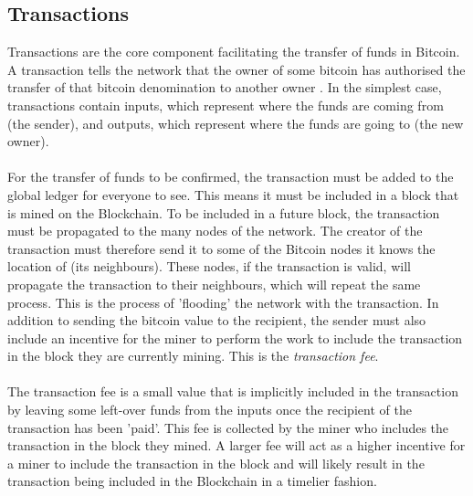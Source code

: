 \subsection{Transactions}\label{background-transactions}
Transactions are the core component facilitating the transfer of funds in Bitcoin. A transaction tells the network that the owner of some bitcoin has authorised the transfer of that bitcoin denomination to another owner \cite{RefWorks:doc:5c39e80ae4b0854ae611b047}. In the simplest case, transactions contain inputs, which represent where the funds are coming from (the sender), and outputs, which represent where the funds are going to (the new owner). 
\\\\
For the transfer of funds to be confirmed, the transaction must be added to the global ledger for everyone to see. This means it must be included in a block that is mined on the Blockchain. To be included in a future block, the transaction must be propagated to the many nodes of the network. The creator of the transaction must therefore send it to some of the Bitcoin nodes it knows the location of (its neighbours). These nodes, if the transaction is valid, will propagate the transaction to their neighbours, which will repeat the same process. This is the process of 'flooding' the network with the transaction. In addition to sending the bitcoin value to the recipient, the sender must also include an incentive for the miner to perform the work to include the transaction in the block they are currently mining. This is the \textit{transaction fee}.
\\\\
The transaction fee is a small value that is implicitly included in the transaction by leaving some left-over funds from the inputs once the recipient of the transaction has been 'paid'. This fee is collected by the miner who includes the transaction in the block they mined. A larger fee will act as a higher incentive for a miner to include the transaction in the block and will likely result in the transaction being included in the Blockchain in a timelier fashion.  

